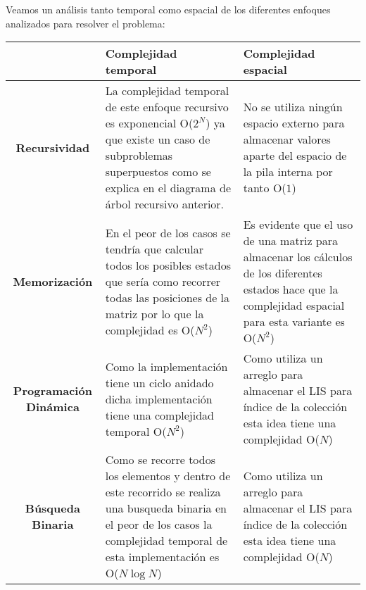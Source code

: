 Veamos un análisis tanto temporal como espacial de los diferentes enfoques analizados para resolver el problema:

\begin{longtable}{|c|p{5.5cm}|p{5.5cm}|}
	\hline
	& \textbf{Complejidad temporal} & \textbf{Complejidad espacial} \\
	\hline
	\textbf{Recursividad} &  La complejidad temporal de este enfoque recursivo es exponencial O($2^N$) ya que existe un caso de subproblemas superpuestos como se explica en el diagrama de árbol recursivo anterior.  & No se utiliza ningún espacio externo para almacenar valores aparte del espacio de la pila interna por tanto O($1$) \\ \hline
	\textbf{Memorización} & En el peor de los casos se tendría que calcular todos los posibles estados que sería como recorrer todas las posiciones de la matriz por lo que la complejidad es O($N^2$) & Es evidente que el uso de una matriz para almacenar los cálculos de los diferentes estados hace que la complejidad espacial para esta variante es O($N^2$) \\ \hline
	\textbf{Programación Dinámica} & Como la implementación tiene un ciclo anidado dicha implementación tiene una complejidad temporal O($N^2$)  & Como utiliza un arreglo para almacenar el LIS para índice de la colección esta idea tiene una complejidad O($N$)  \\ \hline
	\textbf{Búsqueda Binaria} & Como se recorre todos los elementos y dentro de este recorrido se realiza una busqueda binaria en el peor de los casos la complejidad temporal de esta implementación es O($N\log N$)  &  Como utiliza un arreglo para almacenar el LIS para índice de la colección esta idea tiene una complejidad O($N$)\\ \hline
\end{longtable} 